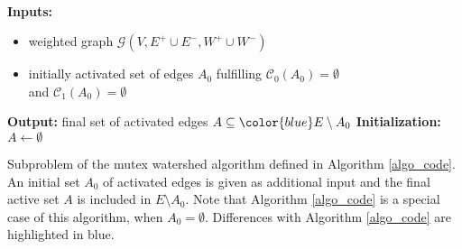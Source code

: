 \begin{algorithm}[t]
 \hrulefill \\
   \textbf{Inputs: }
    \begin{itemize}
    \item  weighted graph $\mathcal{G}(V,  E^+\cup E^-, W^+\cup W^-)$\;
    \item {\color{blue}initially activated set of edges $A_0$ fulfilling $\mathcal{C}_{0}(A_0) = \emptyset $ \\ and $\mathcal{C}_{1}(A_0) = \emptyset $} \;
    \end{itemize}
      \textbf{Output: }
     final set of activated edges $A \subseteq {\color{blue} E \setminus A_0}$\;
  \textbf{Initialization: }
     $A \leftarrow \emptyset$\;
 {
 }
 \vspace{-6pt}\hrulefill
 \vspace{6pt}
 \caption{Subproblem of the mutex watershed algorithm defined in Algorithm \ref{algo_code}. An initial set $A_0$ of activated edges is given as additional input and the final active set $A$ is included in $E \setminus A_0$. Note that Algorithm \ref{algo_code} is a special case of this algorithm, when $A_0= \emptyset$. Differences with Algorithm \ref{algo_code} are highlighted in blue.}
 \label{algo_subproblems}
\end{algorithm}




